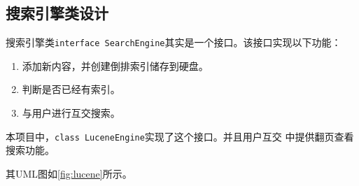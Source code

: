 \documentclass[UTF8,a4paper,12pt]{ctexart}
\begin{document}
\subsection{搜索引擎类设计}
搜索引擎类\texttt{interface SearchEngine}其实是一个接口。该接口实现以下功能：
\begin{enumerate}[label=(\arabic*), wide=2em]
\item 添加新内容，并创建倒排索引储存到硬盘。
\item 判断是否已经有索引。
\item 与用户进行互交搜索。
\end{enumerate}\par
本项目中，\texttt{class LuceneEngine}实现了这个接口。并且用户互交
中提供翻页查看搜索功能。\par
其UML图如\autoref{fig:lucene}所示。\par
\end{document}
